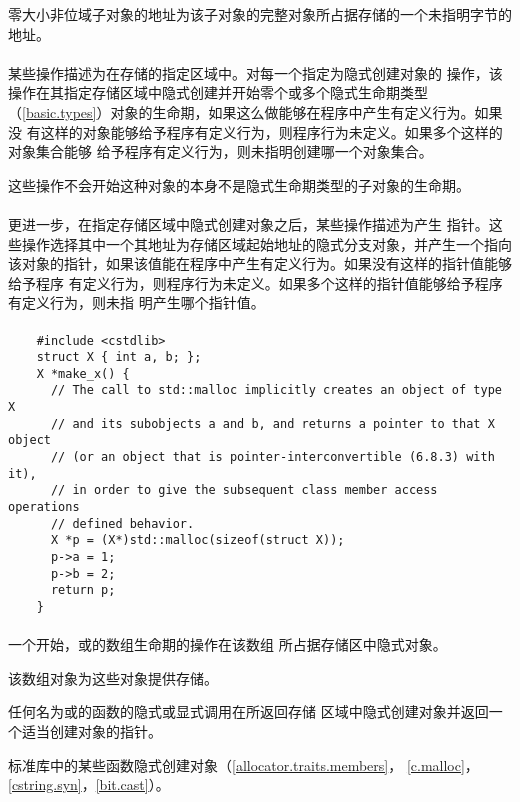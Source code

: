 零大小非位域子对象的地址为该子对象的完整对象所占据存储的一个未指明字节的地址。

\paragraph{} %
某些操作描述为在存储的指定区域中。对每一个指定为隐式创建对象的
操作，该操作在其指定存储区域中隐式创建并开始零个或多个隐式生命期类型
（\ref{basic.types}）对象的生命期，如果这么做能够在程序中产生有定义行为。如果没
有这样的对象能够给予程序有定义行为，则程序行为未定义。如果多个这样的对象集合能够
给予程序有定义行为，则未指明创建哪一个对象集合。

\begin{note}
  这些操作不会开始这种对象的本身不是隐式生命期类型的子对象的生命期。
\end{note}

\paragraph{} %
更进一步，在指定存储区域中隐式创建对象之后，某些操作描述为产生
指针。这些操作选择其中一个其地址为存储区域起始地址的隐式分支对象，并产生一个指向
该对象的指针，如果该值能在程序中产生有定义行为。如果没有这样的指针值能够给予程序
有定义行为，则程序行为未定义。如果多个这样的指针值能够给予程序有定义行为，则未指
明产生哪个指针值。

\paragraph{} %
\begin{example}
  \begin{lstlisting}
    #include <cstdlib>
    struct X { int a, b; };
    X *make_x() {
      // The call to std::malloc implicitly creates an object of type X
      // and its subobjects a and b, and returns a pointer to that X object
      // (or an object that is pointer-interconvertible (6.8.3) with it),
      // in order to give the subsequent class member access operations
      // defined behavior.
      X *p = (X*)std::malloc(sizeof(struct X));
      p->a = 1;
      p->b = 2;
      return p;
    }
  \end{lstlisting}
\end{example}

\paragraph{} %
一个开始，或的数组生命期的操作在该数组
所占据存储区中隐式对象。

\begin{note}
  该数组对象为这些对象提供存储。
\end{note}

任何名为或的函数的隐式或显式调用在所返回存储
区域中隐式创建对象并返回一个适当创建对象的指针。

\begin{note}
  \cpp{}标准库中的某些函数隐式创建对象（\ref{allocator.traits.members}，
  \ref{c.malloc}，\ref{cstring.syn}，\ref{bit.cast}）。
\end{note}

